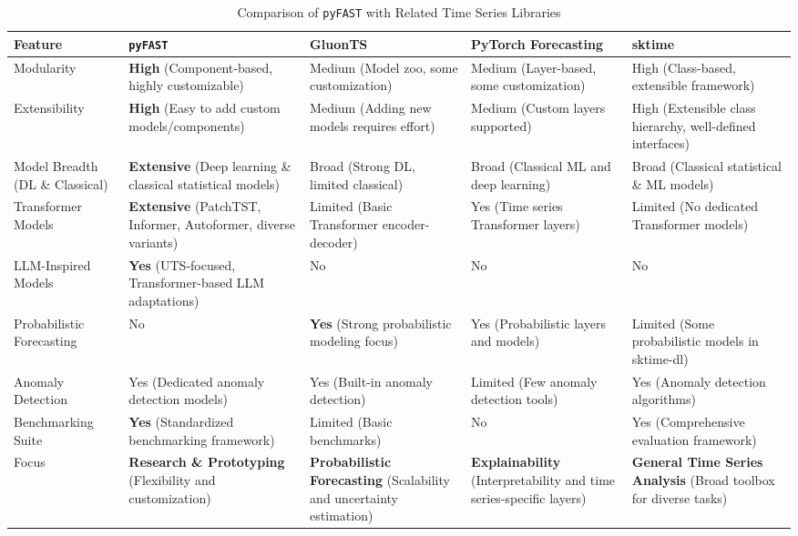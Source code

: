 \documentclass{article}
\begin{document}
\begin{table*}[t!]
    \centering
    \caption{Comparison of \texttt{pyFAST} with Related Time Series Libraries}
    \label{tab:library_comparison}
    \begin{tabularx}{\textwidth}{@{}XXXXX@{}}
    \toprule
    Feature & \texttt{pyFAST} & GluonTS & PyTorch Forecasting & sktime \\
    \midrule
    Modularity & \textbf{High} (Component-based, highly customizable) & Medium (Model zoo, some customization) & Medium (Layer-based, some customization) & High (Class-based, extensible framework) \\
    Extensibility & \textbf{High} (Easy to add custom models/components) & Medium (Adding new models requires effort) & Medium (Custom layers supported) & High (Extensible class hierarchy, well-defined interfaces) \\
    Model Breadth (DL \& Classical) & \textbf{Extensive} (Deep learning \& classical statistical models) & Broad (Strong DL, limited classical) & Broad (Classical ML and deep learning) & Broad (Classical statistical \& ML models) \\
    Transformer Models & \textbf{Extensive} (PatchTST, Informer, Autoformer, diverse variants) & Limited (Basic Transformer encoder-decoder) & Yes (Time series Transformer layers) & Limited (No dedicated Transformer models) \\
    LLM-Inspired Models & \textbf{Yes} (UTS-focused, Transformer-based LLM adaptations) & No & No & No \\
    Probabilistic Forecasting & No & \textbf{Yes} (Strong probabilistic modeling focus) & Yes (Probabilistic layers and models) & Limited (Some probabilistic models in sktime-dl) \\
    Anomaly Detection & Yes (Dedicated anomaly detection models) & Yes (Built-in anomaly detection) & Limited (Few anomaly detection tools) & Yes (Anomaly detection algorithms) \\
    Benchmarking Suite & \textbf{Yes} (Standardized benchmarking framework) & Limited (Basic benchmarks) & No & Yes (Comprehensive evaluation framework) \\
    Focus & \textbf{Research \& Prototyping} (Flexibility and customization) & \textbf{Probabilistic Forecasting} (Scalability and uncertainty estimation) & \textbf{Explainability} (Interpretability and time series-specific layers) & \textbf{General Time Series Analysis} (Broad toolbox for diverse tasks) \\
    \bottomrule
    \end{tabularx}
\end{table*}
\end{document}
